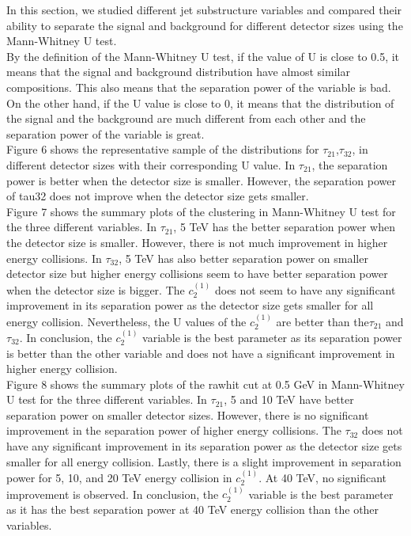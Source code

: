In this section, we studied different jet substructure variables and compared their ability to separate the signal and background for different detector sizes using the Mann-Whitney U test.\\

By the definition of the Mann-Whitney U test, if the value of U is close to 0.5, it means that the signal and background distribution have almost similar compositions. This also means that the separation power of the variable is bad. On the other hand, if the U value is close to 0, it means that the distribution of the signal and the background are much different from each other and the separation power of the variable is great.\\

Figure 6 shows the representative sample of the distributions for $\tau_{21}$,$\tau_{32}$, in different detector sizes with their corresponding U value. In $\tau_{21}$, the separation power is better when the detector size is smaller. However, the separation power of tau32 does not improve when the detector size gets smaller.\\

Figure 7 shows the summary plots of the clustering in Mann-Whitney U test for the three different variables.  In $\tau_{21}$, 5 TeV has the better separation power when the detector size is smaller. However, there is not much improvement in higher energy collisions. In $\tau_{32}$, 5 TeV has also better separation power on smaller detector size but higher energy collisions seem to have better separation power when the detector size is bigger. The $c_2^{(1)}$ does not seem to have any significant improvement in its separation power as the detector size gets smaller for all energy collision. Nevertheless, the U values of the $c_2^{(1)}$ are better than the$\tau_{21}$ and $\tau_{32}$. In conclusion, the $c_2^{(1)}$ variable is the best parameter as its separation power is better than the other variable and does not have a significant improvement in higher energy collision.\\

Figure 8 shows the summary plots of the rawhit cut at 0.5 GeV in Mann-Whitney U test for the three different variables. In $\tau_{21}$, 5 and 10 TeV have better separation power on smaller detector sizes. However, there is no significant improvement in the separation power of higher energy collisions.  The $\tau_{32}$ does not have any significant improvement in its separation power as the detector size gets smaller for all energy collision. Lastly, there is a slight improvement in separation power for 5, 10, and 20 TeV energy collision in $c_2^{(1)}$. At 40 TeV, no significant improvement is observed. In conclusion, the $c_2^{(1)}$ variable is the best parameter as it has the best separation power at 40 TeV energy collision than the other variables.\\

